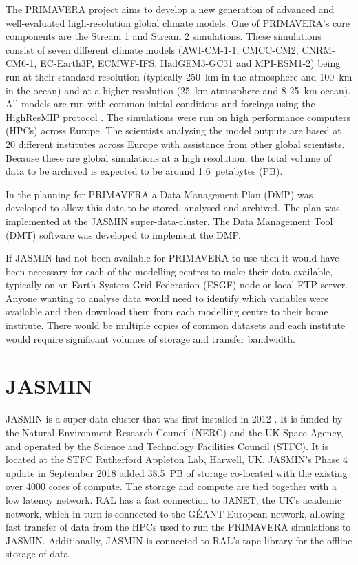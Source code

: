 \documentclass[gmd, manuscript]{copernicus}
\begin{document}


\introduction  %

The PRIMAVERA project aims to develop a new generation of advanced and well-evaluated high-resolution global climate models. One of PRIMAVERA's core components are the Stream 1 and Stream 2 simulations. These simulations consist of seven different climate models (AWI-CM-1-1, CMCC-CM2, CNRM-CM6-1, EC-Earth3P, ECMWF-IFS, HadGEM3-GC31 and MPI-ESM1-2) being run at their standard resolution (typically  250~km in the atmosphere and 100~km in the ocean) and at a higher resolution (25~km atmosphere and 8-25~km ocean). All models are run with common initial conditions and forcings using the HighResMIP protocol \citep{Haarsma2016}. The simulations were run on high performance computers (HPCs) across Europe. The scientists analysing the model outputs are based at 20 different institutes across Europe with assistance from other global scientists. Because these are global simulations at a high resolution, the total volume of data to be archived is expected to be around 1.6~petabytes (PB).

In the planning for PRIMAVERA a Data Management Plan (DMP) was developed to allow this data to be stored, analysed and archived. The plan was implemented at the JASMIN super-data-cluster. The Data Management Tool (DMT) software was developed to implement the DMP.

If JASMIN had not been available for PRIMAVERA to use then it would have been necessary for each of the modelling centres to make their data available, typically on an Earth System Grid Federation (ESGF) node or local FTP server. Anyone wanting to analyse data would need to identify which variables were available and then download them from each modelling centre to their home institute. There would be multiple copies of common datasets and each institute would require significant volumes of storage and transfer bandwidth.

\section{JASMIN}

JASMIN is a super-data-cluster that was first installed in 2012 \citep{lawrence2013storing}. It is funded by the Natural Environment Research Council (NERC) and the UK Space Agency, and operated by the Science and Technology Facilities Council (STFC). It is located at the STFC Rutherford Appleton Lab, Harwell, UK. JASMIN's Phase 4 update in September 2018 added 38.5~PB of storage co-located with the existing over 4000 cores of compute. The storage and compute are tied together with a low latency network. RAL has a fast connection to JANET, the UK's academic network, which in turn is connected to the G\'{E}ANT European network, allowing fast transfer of data from the HPCs used to run the PRIMAVERA simulations to JASMIN. Additionally, JASMIN is connected to RAL's tape library for the offline storage of data.
\end{document}
